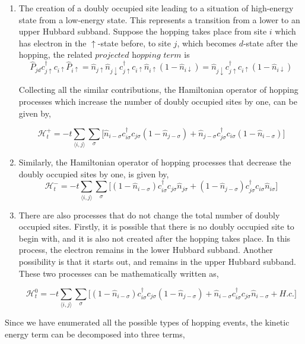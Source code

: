 \documentclass{article}
\begin{document}
\begin{enumerate}
\item  The creation of a doubly occupied site leading to a situation of high-energy state from a low-energy state. This represents a transition from a lower to an upper Hubbard subband. Suppose the hopping takes place from site $i$ which has electron in the $\uparrow$-state before, to site $j$, which becomes $d$-state after the hopping, the related $\textit{projected hopping term}$ is
\\
\begin{equation}
\hat{P}_{jd}c_{j\uparrow}^\dagger c_{i\uparrow} \hat{P}_{i\uparrow} = \hat{n}_{j\uparrow} \hat{n}_{j\downarrow} c_{j\uparrow}^\dagger c_{i\uparrow} \hat{n}_{i\uparrow} (1 - \hat{n}_{i\downarrow}) = \hat{n}_{j\downarrow} c_{j\uparrow}^\dagger c_{i\uparrow}(1 - \hat{n}_{i\downarrow}) 
\end{equation}

Collecting all the similar contributions, the Hamiltonian operator of hopping processes which increase the number of doubly occupied sites by one, can be given by,

\begin{equation}
\mathcal{H}_{t}^{+} = -t \sum_{\langle i, j \rangle} \sum_{\sigma} \big[\hat{n}_{i-\sigma} c_{i\sigma}^\dagger c_{j\sigma}(1 - \hat{n}_{j-\sigma})   + \hat{n}_{j-\sigma} c_{j\sigma}^\dagger c_{i\sigma}(1 - \hat{n}_{i-\sigma})  \big]
\end{equation} 

\item Similarly, the Hamiltonian operator of hopping processes that decrease the doubly occupied sites by one, is given by,
\begin{equation}
\mathcal{H}_{t}^{-} = -t \sum_{\langle i, j \rangle} \sum_{\sigma} \big[(1-\hat{n}_{i-\sigma}) c_{i\sigma}^\dagger c_{j\sigma}\hat{n}_{j\sigma}   + (1-\hat{n}_{j-\sigma}) c_{j\sigma}^\dagger c_{i\sigma}\hat{n}_{i\sigma}  \big]
\end{equation}

\item 
There are also processes that do not change the total number of doubly occupied sites. Firstly, it is possible that there is no doubly occupied site to begin with, and it is also not created after the hopping takes place. In this process, the electron remains in the lower Hubbard subband. Another possibility is that it starts out, and remains in the upper Hubbard subband. These two processes can be mathematically written as,

\begin{equation}
\mathcal{H}_{t}^{0} = -t \sum_{\langle i, j \rangle} \sum_{\sigma} \big[(1-\hat{n}_{i-\sigma}) c_{i\sigma}^\dagger c_{j\sigma}(1-\hat{n}_{j-\sigma})   + \hat{n}_{i-\sigma} c_{i\sigma}^\dagger c_{j\sigma}\hat{n}_{i-\sigma} + H.c.  \big]
\end{equation}

\end{enumerate} 
Since we have enumerated all the possible types of hopping events, the kinetic energy term can be decomposed into three terms,
\end{document}
